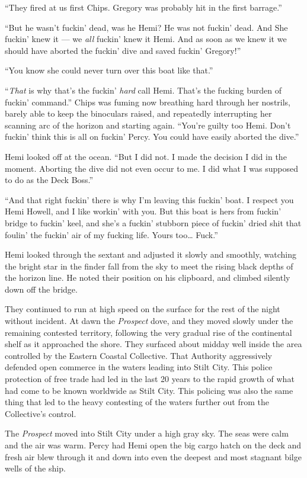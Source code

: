 \documentclass[]{scrbook}
\begin{document}
``They fired at us first Chips. Gregory was probably hit in the first
barrage.''

``But he wasn't fuckin' dead, was he Hemi? He was not fuckin' dead. And
She fuckin' knew it --- we \emph{all} fuckin' knew it Hemi. And as soon
as we knew it we should have aborted the fuckin' dive and saved fuckin'
Gregory!''

``You know she could never turn over this boat like that.''

``\emph{That} is why that's the fuckin' \emph{hard} call Hemi. That's
the fucking burden of fuckin' command.'' Chips was fuming now breathing
hard through her nostrils, barely able to keep the binoculars raised,
and repeatedly interrupting her scanning arc of the horizon and starting
again. ``You're guilty too Hemi. Don't fuckin' think this is all on
fuckin' Percy. You could have easily aborted the dive.''

Hemi looked off at the ocean. ``But I did not. I made the decision I did
in the moment. Aborting the dive did not even occur to me. I did what I
was supposed to do as the Deck Boss.''

``And that right fuckin' there is why I'm leaving this fuckin' boat. I
respect you Hemi Howell, and I like workin' with you. But this boat is
hers from fuckin' bridge to fuckin' keel, and she's a fuckin' stubborn
piece of fuckin' dried shit that foulin' the fuckin' air of my fucking
life. Yours too\ldots{} Fuck.''

Hemi looked through the sextant and adjusted it slowly and smoothly,
watching the bright star in the finder fall from the sky to meet the
rising black depths of the horizon line. He noted their position on his
clipboard, and climbed silently down off the bridge.

They continued to run at high speed on the surface for the rest of the
night without incident. At dawn the \emph{Prospect} dove, and they moved
slowly under the remaining contested territory, following the very
gradual rise of the continental shelf as it approached the shore. They
surfaced about midday well inside the area controlled by the Eastern
Coastal Collective. That Authority aggressively defended open commerce
in the waters leading into Stilt City. This police protection of free
trade had led in the last 20 years to the rapid growth of what had come
to be known worldwide as Stilt City. This policing was also the same
thing that led to the heavy contesting of the waters further out from
the Collective's control.

The \emph{Prospect} moved into Stilt City under a high gray sky. The
seas were calm and the air was warm. Percy had Hemi open the big cargo
hatch on the deck and fresh air blew through it and down into even the
deepest and most stagnant bilge wells of the ship.
\end{document}

